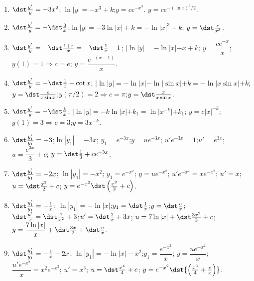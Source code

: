 \documentclass[openany]{book}
\newenvironment{sectionSolutions}{
 \begin{enumerate}[item-label={\thesection.\arabic{enumi}.}]
}{
 \end{enumerate}
}
\begin{document}
\begin{sectionSolutions}
\item
$\dst\frac{y'}{ y}=-3x^2$;\quad $|\ln|y|=-x^3+k$;\quad $y=ce^{-x^3}$.
$y=ce^{-(\ln x)^2/2}$.

\item
$\dst\frac{y'}{ y}=-\dst\frac{3}{ x}$;\quad $\ln|y|=-3\ln|x|+k=-\ln|x|^3+k$;\quad
$y=\dst\frac{c}{ x^3}$.

\item
$\dst\frac{y'}{ y}=-\dst\frac{1+x}{ x}=-\dst\frac{1}{ x}-1$;\quad
$|\ln|y|=-\ln|x|-x+k$;\quad
$y=\dfrac{ce^{-x}}{ x}$;\quad
$y(1)=1\Rightarrow
 c=e$;\quad
$y=\dfrac{e^{-(x-1)}}{ x}$.


\item
$\dst\frac{y'}{ y}=-\dst\frac{1}{ x}-\cot x$;
\quad $|\ln|y|=-\ln|x|-\ln|\sin x|+k=-\ln|x\sin x|+k$;\quad
$y=\dst\frac{c}{ x\sin x}$;\quad $y(\pi/2)=2\Rightarrow
c=\pi$;\quad $y=\dst\frac{\pi}{ x\sin x}$.


\item
$\dst\frac{y'}{ y}=-\dst\frac{k}{ x}$;\quad
$|\ln|y|=-k\ln|x|+k_1=\ln|x^{-k}|+k_1$;\quad
$y=c|x|^{-k}$;\quad
$y(1)=3\Rightarrow c=3$;\quad $y=3x^{-k}$.


\item
 $\dst\frac{y_1'}{ y_1}=-3$;\quad $\ln|y_1|=-3x$;\quad
$y_1=e^{-3x}$;\quad $y=ue^{-3x}$;\quad
$u'e^{-3x}=1$;\quad $u'=e^{3x}$;\quad $u=\dfrac{e^{3x}}{3}+c$;\quad
$y=\dst\frac{1}{3}+ce^{-3x}$.



\item
$\dst\frac{y_1'}{ y_1}=-2x$;\quad
$\ln|y_1|=-x^2$;\quad
$y_1=e^{-x^2}$;\quad
$y=ue^{-x^2}$;\quad
$u'e^{-x^2}=xe^{-x^2}$;\quad
$u'=x$;\quad
$u=\dst\frac{x^2}{2}+c$;\quad
$y=e^{-x^2}\dst\left(\frac{x^2}{2}+c\right)$.

\item
$\dst\frac{y_1'}{ y_1}=-\frac{1}{ x}$;\quad
$\ln|y_1|=-\ln|x|$;\quad $y_1=\dst\frac{1}{ x}$;\quad $y=\dst\frac{u}{
x}$;\quad
$\dst\frac{u'}{ x}=\dst\frac{7}{ x^2}+3$;\quad $u'=\dst\frac{7}{
x}+3x$;\quad
$u=7\ln|x|+\dst\frac{3x^2}{2}+c$;\quad $y=\dfrac{7\ln|x|}{
x}+\dst\frac{3x}{2}+\dst\frac{c}{ x}$.

\item
$\dst\frac{y_1'}{ y_1}=-\frac{1}{ x}-2x$; \quad
$\ln|y_1|=-\ln|x|-x^2$;\quad $y_1=\dfrac{e^{-x^2}}{ x}$;\quad
$y=\dfrac{ue^{-x^2}}{ x}$;\quad
$\dfrac{u'e^{-x^2}}{ x}=x^2e^{-x^2}$;\quad
 $u'=x^3$;\quad
$u=\dst\frac{x^4}{4}+c$;\quad
$y=e^{-x^2}\dst{\left(\frac{x^3}{4}+\frac{c}{ x}\right)}$.


\end{sectionSolutions}
\end{document}
